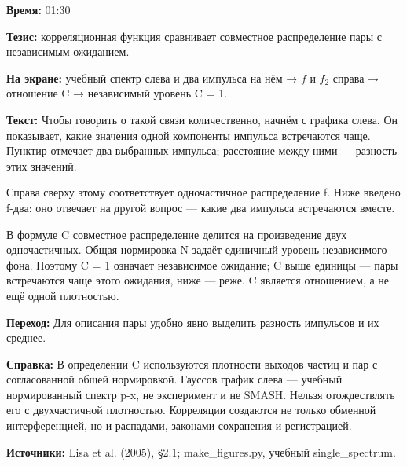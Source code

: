 \textbf{Время:} 01:30

\textbf{Тезис:} корреляционная функция сравнивает совместное распределение пары с независимым ожиданием.

\textbf{На экране:} учебный спектр слева и два импульса на нём → \(f\) и \(f_2\) справа → отношение C → независимый уровень C = 1.

\textbf{Текст:} Чтобы говорить о такой связи количественно, начнём с графика слева. Он показывает, какие значения одной компоненты импульса встречаются чаще. Пунктир отмечает два выбранных импульса; расстояние между ними — разность этих значений.

Справа сверху этому соответствует одночастичное распределение f. Ниже введено f-два: оно отвечает на другой вопрос — какие два импульса встречаются вместе.

В формуле C совместное распределение делится на произведение двух одночастичных. Общая нормировка N задаёт единичный уровень независимого фона. Поэтому C = 1 означает независимое ожидание; C выше единицы — пары встречаются чаще этого ожидания, ниже — реже. C является отношением, а не ещё одной плотностью.

\textbf{Переход:} Для описания пары удобно явно выделить разность импульсов и их среднее.

\textbf{Справка:} В определении C используются плотности выходов частиц и пар с согласованной общей нормировкой. Гауссов график слева — учебный нормированный спектр p-x, не эксперимент и не SMASH. Нельзя отождествлять его с двухчастичной плотностью. Корреляции создаются не только обменной интерференцией, но и распадами, законами сохранения и регистрацией.

\textbf{Источники:} Lisa et al. (2005), §2.1; make\_figures.py, учебный single\_spectrum.
